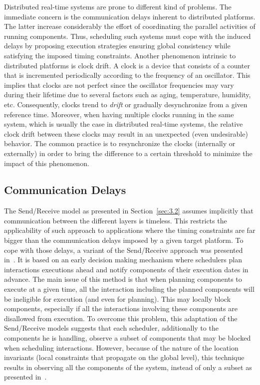 Distributed real-time systems are prone to different kind of problems. The immediate concern 
is the communication delays inherent to distributed platforms. The latter increase considerably
the effort of coordinating the parallel activities of running components. Thus, scheduling
such systems must cope with the induced delays by proposing execution strategies ensuring 
global consistency while satisfying the imposed timing constraints.
Another phenomenon intrinsic to distributed platforms is clock drift. A clock is a device
that consists of a counter that is incremented periodically according to the frequency of 
an oscillator. This implies that clocks are not perfect since the oscillator frequencies may
vary during their lifetime due to several factors such as aging, temperature, humidity, etc.
Consequently, clocks trend to \emph{drift} or gradually desynchronize from a given reference 
time. Moreover, when having multiple clocks running in the same system, which is usually the
case in distributed real-time systems, the relative clock drift between these clocks
may result in an unexpected (even undesirable) behavior. The common practice is to 
resynchronize the clocks (internally or externally) in order to bring the difference to 
a certain threshold to minimize the impact of this phenomenon. 

\subsection{Communication Delays}

The Send/Receive model as presented in Section~\ref{sec:3.2} assumes implicitly that 
communication between the different layers is timeless. This restricts the applicability
of such approach to applications where the timing constraints are far bigger than the 
communication delays imposed by a given target platform.  
To cope with those delays, a variant of the Send/Receive approach was presented 
in~\cite{ahlem_these}. 
It is based on an early decision making mechanism where schedulers plan interactions executions 
ahead and notify components of their execution dates in advance. 
The main issue of this method is that when planning components to execute at a given time,
all the interaction including the planned components will be ineligible for execution (and even
for planning). This may locally block components, especially if all the interactions 
involving these components are disallowed from execution. To overcome this problem,
this adaptation of the Send/Receive models suggests that each scheduler, additionally to the
components he is handling, observe a subset of components that may be blocked when 
scheduling interactions. However, because of the nature of the location invariants (local
constraints that propagate on the global level), this technique results in observing
all the components of the system, instead of only a subset as presented in~\cite{ahlem_these}.

